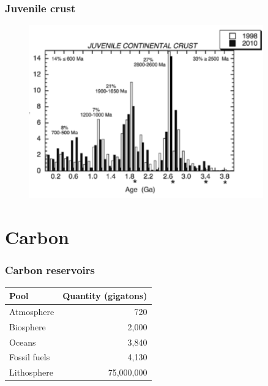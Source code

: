 \documentclass{beamer}
\begin{document}
        \begin{frame}
        \frametitle{Juvenile crust}
        \begin{figure}
        \begin{center}
                \includegraphics[width=0.9\textwidth]{juvenile.png}
        \end{center}
        \end{figure}
        \end{frame}
        
        \section{Carbon}
        \begin{frame}
        \frametitle{Carbon reservoirs}
        \begin{center}
        \begin{tabular}{l | r}
                Pool    &       Quantity (gigatons) \\\hline\hline
                Atmosphere      &       720 \\
                Biosphere       &       2,000 \\
                Oceans          &       3,840 \\
                Fossil fuels    &       4,130 \\
                \alert{Lithosphere}     &       \alert{75,000,000}
        \end{tabular}
        \end{center}
        \end{frame}
        
\end{document}
